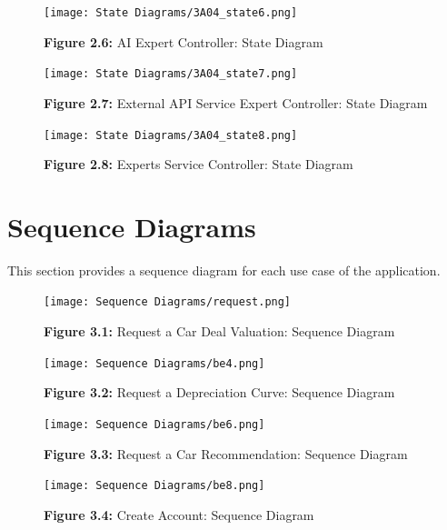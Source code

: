 \documentclass[]{article}
\begin{document}
\begin{figure}[H]
  \centering
  \texttt{[image: State Diagrams/3A04\_state6.png]}
  
  \textbf{Figure 2.6:} AI Expert Controller: State Diagram\label{Fig:2.6}
\end{figure}

\begin{figure}[H]
  \centering
  \texttt{[image: State Diagrams/3A04\_state7.png]}
  
  \textbf{Figure 2.7:} External API Service Expert Controller: State Diagram\label{Fig:2.7}
\end{figure}

\begin{figure}[H]
  \centering
  \texttt{[image: State Diagrams/3A04\_state8.png]}
  
  \textbf{Figure 2.8:} Experts Service Controller: State Diagram\label{Fig:2.8}
\end{figure}

\section{Sequence Diagrams}
\label{sec:sequence_diagrams}
This section provides a sequence diagram for each use case of the application.

\begin{figure}[H]
  \centering
  \texttt{[image: Sequence Diagrams/request.png]}
  
  \textbf{Figure 3.1:} Request a Car Deal Valuation: Sequence Diagram\label{Fig:3.1}
\end{figure}

\begin{figure}[H]
  \centering
  \texttt{[image: Sequence Diagrams/be4.png]}
  
  \textbf{Figure 3.2:} Request a Depreciation Curve: Sequence Diagram\label{Fig:3.2}
\end{figure}

\begin{figure}[H]
  \centering
  \texttt{[image: Sequence Diagrams/be6.png]}
  
  \textbf{Figure 3.3:} Request a Car Recommendation: Sequence Diagram \label{Fig:3.3}
\end{figure}

\begin{figure}[H]
  \centering
  \texttt{[image: Sequence Diagrams/be8.png]}
  
  \textbf{Figure 3.4:} Create Account: Sequence Diagram \label{Fig:3.4}
\end{figure}
\end{document}

